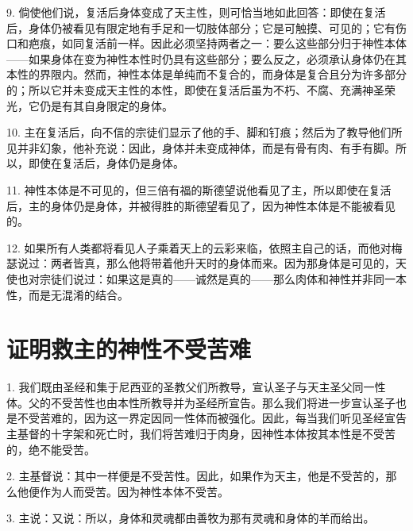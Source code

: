 9. 倘使他们说，复活后身体变成了天主性，则可恰当地如此回答：即使在复活后，身体仍被看见有限定地有手足和一切肢体部分；它是可触摸、可见的；它有伤口和疤痕，如同复活前一样。因此必须坚持两者之一：要么这些部分归于神性本体——如果身体在变为神性本性时仍具有这些部分；要么反之，必须承认身体仍在其本性的界限内。然而，神性本体是单纯而不复合的，而身体是复合且分为许多部分的；所以它并未变成天主性的本性，即使在复活后虽为不朽、不腐、充满神圣荣光，它仍是有其自身限定的身体。\par

10. 主在复活后，向不信的宗徒们显示了他的手、脚和钉痕；然后为了教导他们所见并非幻象，他补充说：因此，身体并未变成神体，而是有骨有肉、有手有脚。所以，即使在复活后，身体仍是身体。\par

11. 神性本体是不可见的，但三倍有福的斯德望说他看见了主，所以即使在复活后，主的身体仍是身体，并被得胜的斯德望看见了，因为神性本体是不能被看见的。\par

12. 如果所有人类都将看见人子乘着天上的云彩来临，依照主自己的话，而他对梅瑟说过：两者皆真，那么他将带着他升天时的身体而来。因为那身体是可见的，天使也对宗徒们说过：如果这是真的——诚然是真的——那么肉体和神性并非同一本性，而是无混淆的结合。\par


\section{证明救主的神性不受苦难}

1. 我们既由圣经和集于尼西亚的圣教父们所教导，宣认圣子与天主圣父同一性体。父的不受苦性也由本性所教导并为圣经所宣告。那么我们将进一步宣认圣子也是不受苦难的，因为这一界定因同一性体而被强化。因此，每当我们听见圣经宣告主基督的十字架和死亡时，我们将苦难归于肉身，因神性本体按其本性是不受苦的，绝不能受苦。\par

2. 主基督说：其中一样便是不受苦性。因此，如果作为天主，他是不受苦的，那么他便作为人而受苦。因为神性本体不受苦。\par

3. 主说：又说：所以，身体和灵魂都由善牧为那有灵魂和身体的羊而给出。\par

